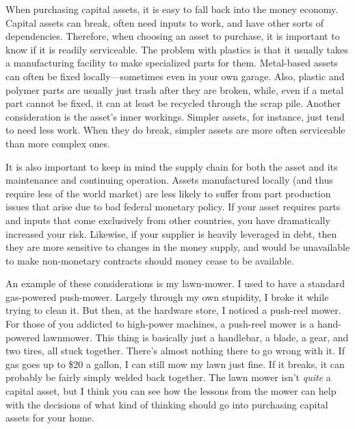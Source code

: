 When purchasing capital assets, it is easy to fall back into the money
economy. Capital assets can break, often need inputs to work, and have
other sorts of dependencies. Therefore, when choosing an asset to
purchase, it is important to know if it is readily serviceable. The
problem with plastics is that it usually takes a manufacturing facility
to make specialized parts for them. Metal-based assets can often be
fixed locally—sometimes even in your own garage. Also, plastic and
polymer parts are usually just trash after they are broken, while, even
if a metal part cannot be fixed, it can at least be recycled through
the scrap pile.  Another consideration is the asset's
inner workings.  Simpler assets, for instance, just tend to need less
work.  When they do break, simpler assets are more often serviceable
than more complex ones.  

It is also important to keep in mind the supply chain for both the asset
and its maintenance and continuing operation.  Assets manufactured
locally (and thus require less of the world market) are less likely to
suffer from part production issues that arise due to bad federal
monetary policy.  If your asset requires parts and inputs that come
exclusively from other countries, you have dramatically increased your
risk.  Likewise, if your supplier is heavily leveraged in debt, then
they are more sensitive to changes in the money supply, and would be
unavailable to make non-monetary contracts should money cease to be
available.  

An example of these considerations is my lawn-mower. I used to have a
standard gas-powered push-mower. Largely through my own stupidity, I
broke it while trying to clean it. But then, at the hardware store, I
noticed a push-reel mower. For those of you addicted to high-power
machines, a push-reel mower is a hand-powered lawnmower. This thing is
basically just a handlebar, a blade, a gear, and two tires, all stuck
together. There’s almost nothing there to go wrong with it. If gas goes
up to \$20 a gallon, I can still mow my lawn just fine.  If it breaks,
it can probably be fairly simply welded back together. The lawn mower
isn’t \textit{quite} a capital asset, but I think you can see how the
lessons from the mower can help with the decisions of what kind of
thinking should go into purchasing capital assets for your home.

